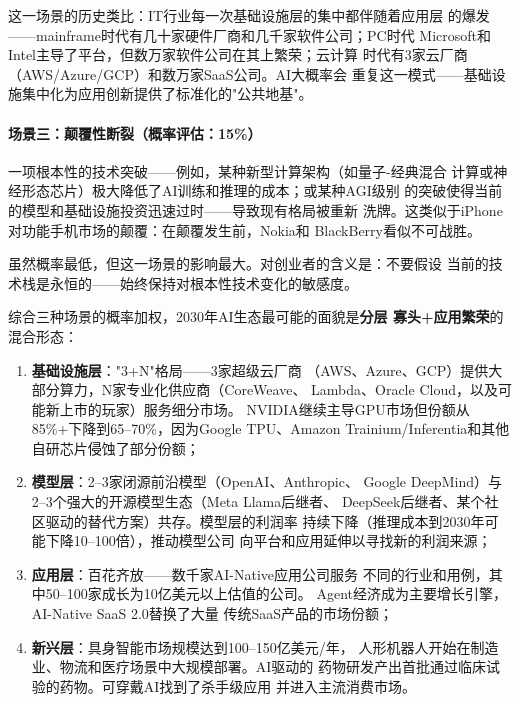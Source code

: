 这一场景的历史类比：IT行业每一次基础设施层的集中都伴随着应用层
的爆发——mainframe时代有几十家硬件厂商和几千家软件公司；PC时代
Microsoft和Intel主导了平台，但数万家软件公司在其上繁荣；云计算
时代有3家云厂商（AWS/Azure/GCP）和数万家SaaS公司。AI大概率会
重复这一模式——基础设施集中化为应用创新提供了标准化的"公共地基"。

\paragraph{场景三：颠覆性断裂（概率评估：15\%）}
一项根本性的技术突破——例如，某种新型计算架构（如量子-经典混合
计算或神经形态芯片）极大降低了AI训练和推理的成本；或某种AGI级别
的突破使得当前的模型和基础设施投资迅速过时——导致现有格局被重新
洗牌。这类似于iPhone对功能手机市场的颠覆：在颠覆发生前，Nokia和
BlackBerry看似不可战胜。

虽然概率最低，但这一场景的影响最大。对创业者的含义是：不要假设
当前的技术栈是永恒的——始终保持对根本性技术变化的敏感度。

\begin{corebox}[2030年AI生态最可能的面貌]
综合三种场景的概率加权，2030年AI生态最可能的面貌是\textbf{分层
寡头+应用繁荣}的混合形态：

\begin{enumerate}
  \item \textbf{基础设施层}："3+N"格局——3家超级云厂商
    （AWS、Azure、GCP）提供大部分算力，N家专业化供应商（CoreWeave、
    Lambda、Oracle Cloud，以及可能新上市的玩家）服务细分市场。
    NVIDIA继续主导GPU市场但份额从85\%+下降到65--70\%，因为Google
    TPU、Amazon Trainium/Inferentia和其他自研芯片侵蚀了部分份额；

  \item \textbf{模型层}：2--3家闭源前沿模型（OpenAI、Anthropic、
    Google DeepMind）与2--3个强大的开源模型生态（Meta Llama后继者、
    DeepSeek后继者、某个社区驱动的替代方案）共存。模型层的利润率
    持续下降（推理成本到2030年可能下降10--100倍），推动模型公司
    向平台和应用延伸以寻找新的利润来源；

  \item \textbf{应用层}：百花齐放——数千家AI-Native应用公司服务
    不同的行业和用例，其中50--100家成长为10亿美元以上估值的公司。
    Agent经济成为主要增长引擎，AI-Native SaaS 2.0替换了大量
    传统SaaS产品的市场份额；

  \item \textbf{新兴层}：具身智能市场规模达到100--150亿美元/年，
    人形机器人开始在制造业、物流和医疗场景中大规模部署。AI驱动的
    药物研发产出首批通过临床试验的药物。可穿戴AI找到了杀手级应用
    并进入主流消费市场。
\end{enumerate}
\end{corebox}


